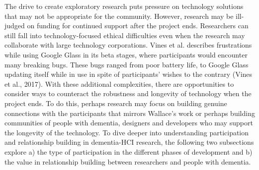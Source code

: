 The drive to create exploratory research puts pressure on technology solutions that may not be appropriate for the community. However, research may be ill-judged on funding for continued support after the project ends. Researchers can still fall into technology-focused ethical difficulties even when the research may collaborate with large technology corporations. Vines et al. describes frustrations while using Google Glass in its beta stages, where participants would encounter many breaking bugs. These bugs ranged from poor battery life, to Google Glass updating itself while in use in spite of participants' wishes to the contrary (Vines et al., 2017). With these additional complexities, there are opportunities to consider ways to counteract the robustness and longevity of technology when the project ends. To do this, perhaps research may focus on building genuine connections with the participants that mirrors Wallace's work or perhaps building communities of people with dementia, designers and developers who may support the longevity of the technology. To dive deeper into understanding participation and relationship building in dementia-HCI research, the following two subsections explore a) the type of participation in the different phases of development and b) the value in relationship building between researchers and people with dementia.









